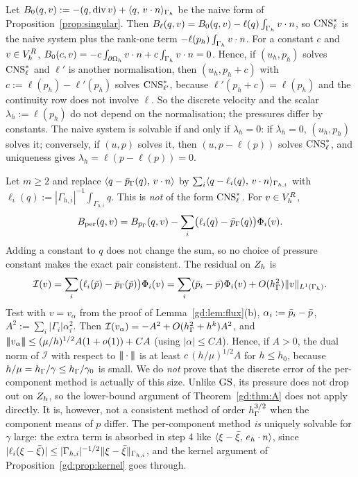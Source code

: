\begin{remark}\label{gd:rem:ell}
Let $B_0(q,v):=-(q,\operatorname{div} v)+\langle q,\, v\cdot n\rangle_{\Gamma_h}$ be the naive form of Proposition~\ref{prop:singular}. Then $B_\ell(q,v)=B_0(q,v)-\ell(q)\int_{\Gamma_h}v\cdot n$, so $\mathrm{CNS}^\ast_\ell$ is the naive system plus the rank-one term $-\ell(p_h)\int_{\Gamma_h}v\cdot n$. For a constant $c$ and $v\in V_h^R$, $B_0(c,v)=-c\int_{\partial\Omega_h}v\cdot n+c\int_{\Gamma_h}v\cdot n=0$. Hence, if $(u_h,p_h)$ solves $\mathrm{CNS}^\ast_\ell$ and $\ell'$ is another normalisation, then $(u_h,p_h+c)$ with $c:=\ell(p_h)-\ell'(p_h)$ solves $\mathrm{CNS}^\ast_{\ell'}$, because $\ell'(p_h+c)=\ell(p_h)$ and the continuity row does not involve $\ell$. So the discrete velocity and the scalar $\lambda_h:=\ell(p_h)$ do not depend on the normalisation; the pressures differ by constants. The naive system is solvable if and only if $\lambda_h=0$: if $\lambda_h=0$, $(u_h,p_h)$ solves it; conversely, if $(u,p)$ solves it, then $(u,p-\ell(p))$ solves $\mathrm{CNS}^\ast_\ell$, and uniqueness gives $\lambda_h=\ell(p-\ell(p))=0$.
\end{remark}

\begin{remark}\label{gd:rem:percomp}
Let $m\ge2$ and replace $\langle q-\bar p_{\Gamma}(q),\, v\cdot n\rangle$ by $\sum_i\langle q-\ell_i(q),\, v\cdot n\rangle_{\Gamma_{h,i}}$ with $\ell_i(q):=|\Gamma_{h,i}|^{-1}\int_{\Gamma_{h,i}}q$. This is \emph{not} of the form $\mathrm{CNS}^\ast_\ell$. For $v\in V_h^R$,
\[
B_{\rm per}(q,v)=B_{\bar p_{\Gamma}}(q,v)-\sum_i\bigl(\ell_i(q)-\bar p_{\Gamma}(q)\bigr)\Phi_i(v).
\]
Adding a constant to $q$ does not change the sum, so no choice of pressure constant makes the exact pair consistent. The residual on $Z_h$ is
\[
\mathcal I(v)=\sum_i\bigl(\ell_i(\tilde p)-\bar p_{\Gamma}(\tilde p)\bigr)\Phi_i(v)=\sum_i(\bar p_i-\bar p)\Phi_i(v)+O(h_\Gamma^2)\lVert v\rVert_{L^1(\Gamma_h)} .
\]
Test with $v=v_\alpha$ from the proof of Lemma~\ref{gd:lem:flux}(b), $\alpha_i:=\bar p_i-\bar p$, $A^2:=\sum_i|\Gamma_i|\alpha_i^2$. Then $\mathcal I(v_\alpha)=-A^2+O(h_\Gamma^2+h^k)A^2$, and $|\!|\!|v_\alpha|\!|\!|\le(\mu/h)^{1/2}A(1+o(1))+CA$ (using $|\alpha|\le CA$). Hence, if $A>0$, the dual norm of $\mathcal I$ with respect to $|\!|\!|\cdot|\!|\!|$ is at least $c\,(h/\mu)^{1/2}A$ for $h\le h_0$, because $h/\mu=h_\Gamma/\gamma\le h_\Gamma/\gamma_0$ is small. We do \emph{not} prove that the discrete error of the per-component method is actually of this size. Unlike $\mathrm{GS}$, its pressure does not drop out on $Z_h$, so the lower-bound argument of Theorem~\ref{gd:thm:A} does not apply directly. It is, however, not a consistent method of order $h_\Gamma^{3/2}$ when the component means of $p$ differ. The per-component method \emph{is} uniquely solvable for $\gamma$ large: the extra term is absorbed in step 4 like $\langle \xi-\bar\xi,\, e_h\cdot n\rangle$, since $|\ell_i(\xi-\bar\xi)|\le|\Gamma_{h,i}|^{-1/2}\lVert \xi-\bar\xi\rVert_{\Gamma_{h,i}}$, and the kernel argument of Proposition~\ref{gd:prop:kernel} goes through.
\end{remark}

